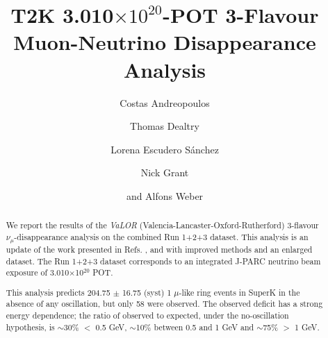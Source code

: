 %
%

\begin{frontmatter}

\title{
  T2K 3.010$\times10^{20}$-POT 3-Flavour Muon-Neutrino Disappearance Analysis
}

\vspace*{0.7cm}

\author[RAL]     {Costas Andreopoulos}
\author[RAL,OXF] {Thomas Dealtry}
\author[IFIC]    {Lorena Escudero S\'anchez}
\author[LANCS]   {Nick Grant}
\author[RAL,OXF] {and Alfons Weber}

\address[RAL]{Particle Physics Dept., Rutherford Appleton Laboratory, STFC \\
              Harwell Oxford Campus\\
              Oxfordshire OX11 0QX, UK}

\address[OXF]{Subdepartment of Particle Physics, University of Oxford \\
              Denys Wilkinson Building, Keble Road\\
              Oxfordshire OX1 3RH, UK}

\address[IFIC]{Instituto de Fisica Corpuscular\\
              CSIC and University of Valencia\\
              Valencia, Spain}

\address[LANCS]{Physics Dept., Lancaster University \\
              Lancaster, LA1 4YB, UK}

%
%

\begin{abstract}

We report the results of the {\em VaLOR} (Valencia-Lancaster-Oxford-Rutherford) 
3-flavour $\nu_{\mu}$-disappearance analysis on the combined Run 1+2+3 dataset.
This analysis is an update of the work presented in
Refs. \cite{OurRun1DisappAnalysis}, \cite{OurRun12DisappAnalysis} and \cite{OurRun12DisappAnalysis3Flavour}
with improved methods and an enlarged dataset.
The Run 1+2+3 dataset corresponds to an integrated J-PARC neutrino beam
exposure of 3.010$\times$10$^{20}$ POT.

This analysis predicts 204.75 $\pm$ 16.75 (syst)
1 $\mu$-like ring events in SuperK in the absence of any oscillation,
but only 58 were observed. The observed deficit has a strong energy dependence;
the ratio of observed to expected, under the no-oscillation hypothesis, is
$\sim$30\% $<$ 0.5 GeV, 
$\sim$10\% between 0.5 and 1 GeV and 
$\sim$75\% $>$ 1 GeV.


\end{abstract}
\end{frontmatter}
